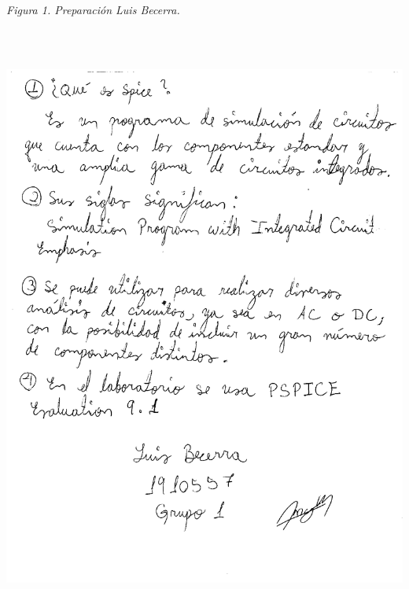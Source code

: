 \documentclass[12pt]{article}
\begin{document}
	\textit{Figura 1. Preparación Luis Becerra.}
	\begin{center}
		\includegraphics[width=16cm,height=20cm]{Img/prelab_Luis}\\
	\end{center}
	
	\newpage
	
\end{document}
